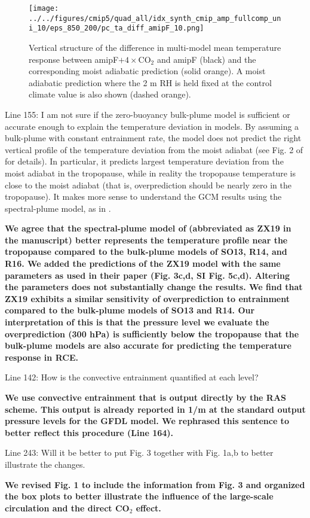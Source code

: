 \documentclass[11pt]{article}
\begin{document}
\begin{figure}[htbp]
\centering
\texttt{[image: ../../figures/cmip5/quad\_all/idx\_synth\_cmip\_amp\_fullcomp\_uni\_10/eps\_850\_200/pc\_ta\_diff\_amipF\_10.png]}
\caption{\label{fig:org279a2fe}Vertical structure of the difference in multi-model mean temperature response between amipF\(+4\times\)CO\(_2\) and amipF (black) and the corresponding moist adiabatic prediction (solid orange). A moist adiabatic prediction where the 2 m RH is held fixed at the control climate value is also shown (dashed orange).}
\end{figure}

Line 155: I am not sure if the zero-buoyancy bulk-plume model is sufficient or accurate enough to explain the temperature deviation in models. By assuming a bulk-plume with constant entrainment rate, the model does not predict the right vertical profile of the temperature deviation from the moist adiabat (see Fig. 2 of \cite{zhou_conceptual_2019} for details). In particular, it predicts largest temperature deviation from the moist adiabat in the tropopause, while in reality the tropopause temperature is close to the moist adiabat (that is, overprediction should be nearly zero in the tropopause). It makes more sense to understand the GCM results using the spectral-plume model, as in \cite{zhou_conceptual_2019}.

\textbf{We agree that the spectral-plume model of} \cite{zhou_conceptual_2019} \textbf{(abbreviated as ZX19 in the manuscript) better represents the temperature profile near the tropopause compared to the bulk-plume models of SO13, R14, and R16. We added the predictions of the ZX19 model with the same parameters as used in their paper (Fig. 3c,d, SI Fig. 5c,d). Altering the parameters does not substantially change the results. We find that ZX19 exhibits a similar sensitivity of overprediction to entrainment compared to the bulk-plume models of SO13 and R14. Our interpretation of this is that the pressure level we evaluate the overprediction (300 hPa) is sufficiently below the tropopause that the bulk-plume models are also accurate for predicting the temperature response in RCE.}

Line 142: How is the convective entrainment quantified at each level?

\textbf{We use convective entrainment that is output directly by the RAS scheme. This output is already reported in 1/m at the standard output pressure levels for the GFDL model. We rephrased this sentence to better reflect this procedure (Line 164).}

Line 243: Will it be better to put Fig. 3 together with Fig. 1a,b to better illustrate the changes.

\textbf{We revised Fig. 1 to include the information from Fig. 3 and organized the box plots to better illustrate the influence of the large-scale circulation and the direct CO\(_2\) effect.}



\end{document}
